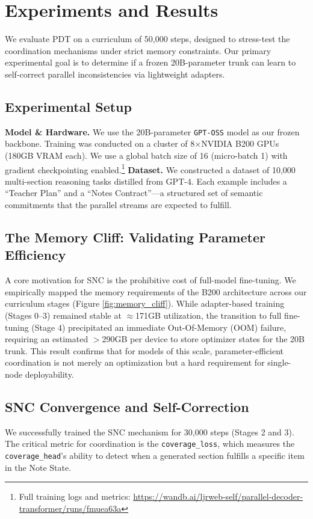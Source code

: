 \section{Experiments and Results}
\label{sec:experiments}

We evaluate PDT on a curriculum of 50,000 steps, designed to stress-test the coordination mechanisms under strict memory constraints. Our primary experimental goal is to determine if a frozen 20B-parameter trunk can learn to self-correct parallel inconsistencies via lightweight adapters.

\subsection{Experimental Setup}
\textbf{Model \& Hardware.} We use the 20B-parameter \texttt{GPT-OSS} model as our frozen backbone. Training was conducted on a cluster of 8$\times$NVIDIA B200 GPUs (180GB VRAM each). We use a global batch size of 16 (micro-batch 1) with gradient checkpointing enabled.\footnote{Full training logs and metrics: \url{https://wandb.ai/ljrweb-self/parallel-decoder-transformer/runs/fmuea63a}}
\textbf{Dataset.} We constructed a dataset of 10,000 multi-section reasoning tasks distilled from GPT-4. Each example includes a ``Teacher Plan'' and a ``Notes Contract''---a structured set of semantic commitments that the parallel streams are expected to fulfill.

\subsection{The Memory Cliff: Validating Parameter Efficiency}
\label{sec:exp_memory}
A core motivation for SNC is the prohibitive cost of full-model fine-tuning. We empirically mapped the memory requirements of the B200 architecture across our curriculum stages (Figure \ref{fig:memory_cliff}).
While adapter-based training (Stages 0--3) remained stable at $\approx$171GB utilization, the transition to full fine-tuning (Stage 4) precipitated an immediate Out-Of-Memory (OOM) failure, requiring an estimated $>$290GB per device to store optimizer states for the 20B trunk.
This result confirms that for models of this scale, parameter-efficient coordination is not merely an optimization but a hard requirement for single-node deployability.

\subsection{SNC Convergence and Self-Correction}
\label{sec:exp_convergence}
We successfully trained the SNC mechanism for 30,000 steps (Stages 2 and 3). The critical metric for coordination is the \texttt{coverage\_loss}, which measures the \texttt{coverage\_head}'s ability to detect when a generated section fulfills a specific item in the Note State.

